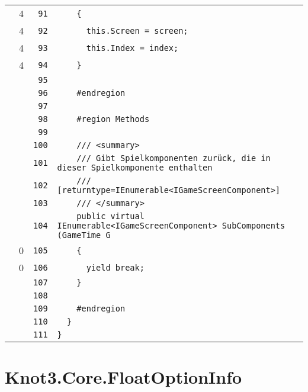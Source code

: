 \documentclass[a4paper,10pt]{article}
\begin{document}
\begin{longtable}[l]{lrrl}
\cellcolor{green} & 4 & \verb~91~ & \verb~    {~\\
\cellcolor{green} & 4 & \verb~92~ & \verb~      this.Screen = screen;~\\
\cellcolor{green} & 4 & \verb~93~ & \verb~      this.Index = index;~\\
\cellcolor{green} & 4 & \verb~94~ & \verb~    }~\\
\cellcolor{gray} &  & \verb~95~ & \verb~~\\
\cellcolor{gray} &  & \verb~96~ & \verb~    #endregion~\\
\cellcolor{gray} &  & \verb~97~ & \verb~~\\
\cellcolor{gray} &  & \verb~98~ & \verb~    #region Methods~\\
\cellcolor{gray} &  & \verb~99~ & \verb~~\\
\cellcolor{gray} &  & \verb~100~ & \verb~    /// <summary>~\\
\cellcolor{gray} &  & \verb~101~ & \verb~    /// Gibt Spielkomponenten zurück, die in dieser Spielkomponente enthalten ~\\
\cellcolor{gray} &  & \verb~102~ & \verb~    /// [returntype=IEnumerable<IGameScreenComponent>]~\\
\cellcolor{gray} &  & \verb~103~ & \verb~    /// </summary>~\\
\cellcolor{gray} &  & \verb~104~ & \verb~    public virtual IEnumerable<IGameScreenComponent> SubComponents (GameTime G~\\
\cellcolor{red} & 0 & \verb~105~ & \verb~    {~\\
\cellcolor{red} & 0 & \verb~106~ & \verb~      yield break;~\\
\cellcolor{gray} &  & \verb~107~ & \verb~    }~\\
\cellcolor{gray} &  & \verb~108~ & \verb~~\\
\cellcolor{gray} &  & \verb~109~ & \verb~    #endregion~\\
\cellcolor{gray} &  & \verb~110~ & \verb~  }~\\
\cellcolor{gray} &  & \verb~111~ & \verb~}~\\
\end{longtable}
\newpage
\section{Knot3.Core.FloatOptionInfo}
\end{document}
